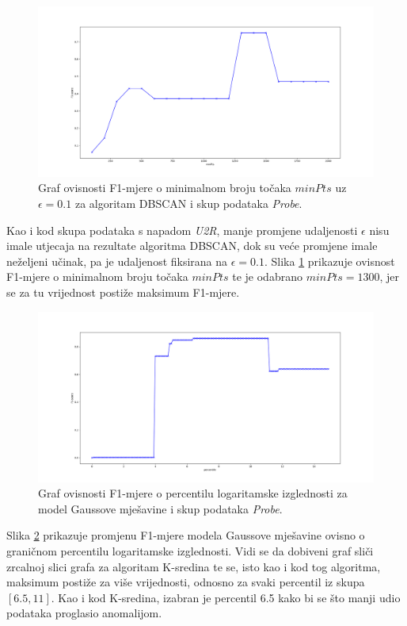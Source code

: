 \documentclass[utf8, diplomski, numeric]{fer}
\begin{document}
\begin{figure}[h!]
\includegraphics[width=1\textwidth]{images/probe-dbscan-f1.png}
\centering
\caption{Graf ovisnosti F1-mjere o minimalnom broju točaka $minPts$ uz $\epsilon = 0.1$ za algoritam DBSCAN i skup podataka \textit{Probe}.}
\label{fig:probe-dbscan}
\end{figure}

Kao i kod skupa podataka s napadom \textit{U2R}, manje promjene udaljenosti $\epsilon$ nisu imale utjecaja na rezultate algoritma DBSCAN, dok su veće promjene imale neželjeni učinak, pa je udaljenost fiksirana na $\epsilon = 0.1$. Slika \ref{fig:probe-dbscan} prikazuje ovisnost F1-mjere o minimalnom broju točaka $minPts$ te je odabrano $minPts = 1300$, jer se za tu vrijednost postiže maksimum F1-mjere.

\begin{figure}[h!]
\includegraphics[width=1\textwidth]{images/probe-gauss-f1.png}
\centering
\caption{Graf ovisnosti F1-mjere o percentilu logaritamske izglednosti za model Gaussove mješavine i skup podataka \textit{Probe}.}
\label{fig:probe-gauss}
\end{figure}

Slika \ref{fig:probe-gauss} prikazuje promjenu F1-mjere modela Gaussove mješavine ovisno o graničnom percentilu logaritamske izglednosti. Vidi se da dobiveni graf sliči zrcalnoj slici grafa za algoritam K-sredina te se, isto kao i kod tog algoritma, maksimum postiže za više vrijednosti, odnosno za svaki percentil iz skupa $[6.5, 11]$. Kao i kod K-sredina, izabran je percentil 6.5 kako bi se što manji udio podataka proglasio anomalijom.
\end{document}

